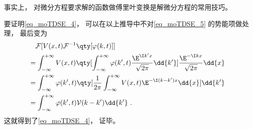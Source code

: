 事实上， 对微分方程要求解的函数做傅里叶变换是解微分方程的常用技巧。 %

要证明\autoref{eq_moTDSE_4}， 可以在以上推导中不对\autoref{eq_moTDSE_5} 的势能项做处理， 最后变为
\begin{equation}
\begin{aligned}
&\quad\mathcal{F}[V(x, t)\mathcal{F}^{-1}\qty[\varphi(k, t)]]\\
&= \int_{-\infty}^{+\infty}V(x, t) \qty[\int_{-\infty}^{+\infty} \varphi(k', t) \frac{\E^{\I k'x}}{\sqrt{2\pi}} \dd{k'}] \frac{\E^{-\I kx}}{\sqrt{2\pi}} \dd{x}\\
&= \int_{-\infty}^{+\infty} \varphi(k', t)\qty[\frac{1}{2\pi}\int_{-\infty}^{+\infty} V(x, t)\E^{-\I (k-k')x} \dd{x}] \dd{k'}\\
&= \int_{-\infty}^{+\infty} \varphi(k', t) \mathcal{V}(k-k')  \dd{k'}~.
\end{aligned}
\end{equation}
这就得到了\autoref{eq_moTDSE_4}， 证毕。
